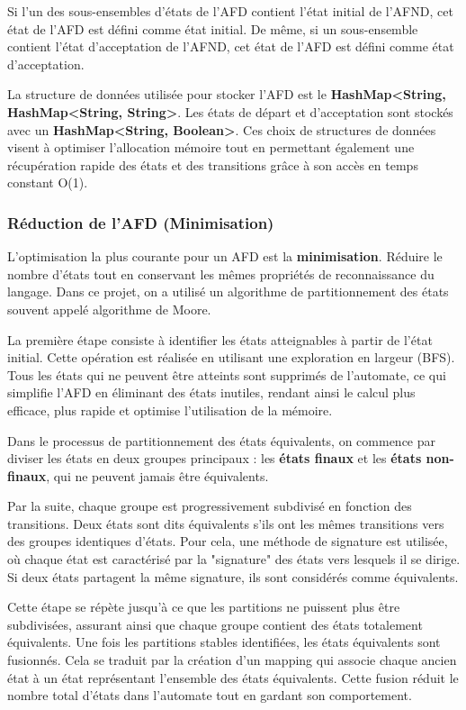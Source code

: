 \documentclass{article}
\begin{document}
Si l'un des sous-ensembles d'états de l'AFD contient l'état initial de l'AFND, cet état de l'AFD est défini comme état initial. De même, si un sous-ensemble contient l'état d'acceptation de l'AFND, cet état de l'AFD est défini comme état d'acceptation.

La structure de données utilisée pour stocker l'AFD est le \textbf{HashMap<String, HashMap<String, String>}. Les états de départ et d'acceptation sont stockés avec un \textbf{HashMap<String, Boolean>}. Ces choix de structures de données visent à optimiser l'allocation mémoire tout en permettant également une récupération rapide des états et des transitions grâce à son accès en temps constant O(1).

\subsubsection{Réduction de l'AFD (Minimisation)}
L'optimisation la plus courante pour un AFD est la \textbf{minimisation}. Réduire le nombre d'états tout en conservant les mêmes propriétés de reconnaissance du langage. Dans ce projet, on a utilisé un algorithme de partitionnement des états souvent appelé algorithme de Moore.

La première étape consiste à identifier les états atteignables à partir de l'état initial. Cette opération est réalisée en utilisant une exploration en largeur (BFS). Tous les états qui ne peuvent être atteints sont supprimés de l'automate, ce qui simplifie l'AFD en éliminant des états inutiles, rendant ainsi le calcul plus efficace, plus rapide et optimise l’utilisation de la mémoire. 

Dans le processus de partitionnement des états équivalents, on commence par diviser les états en deux groupes principaux : les \textbf{états finaux} et les \textbf{états non-finaux}, qui ne peuvent jamais être équivalents.

Par la suite, chaque groupe est progressivement subdivisé en fonction des transitions. Deux états sont dits équivalents s'ils ont les mêmes transitions vers des groupes identiques d'états. Pour cela, une méthode de signature est utilisée, où chaque état est caractérisé par la "signature" des états vers lesquels il se dirige. Si deux états partagent la même signature, ils sont considérés comme équivalents.

Cette étape se répète jusqu'à ce que les partitions ne puissent plus être subdivisées, assurant ainsi que chaque groupe contient des états totalement équivalents. Une fois les partitions stables identifiées, les états équivalents sont fusionnés. Cela se traduit par la création d’un mapping qui associe chaque ancien état à un état représentant l'ensemble des états équivalents. Cette fusion réduit le nombre total d’états dans l’automate tout en gardant son comportement.
\end{document}
